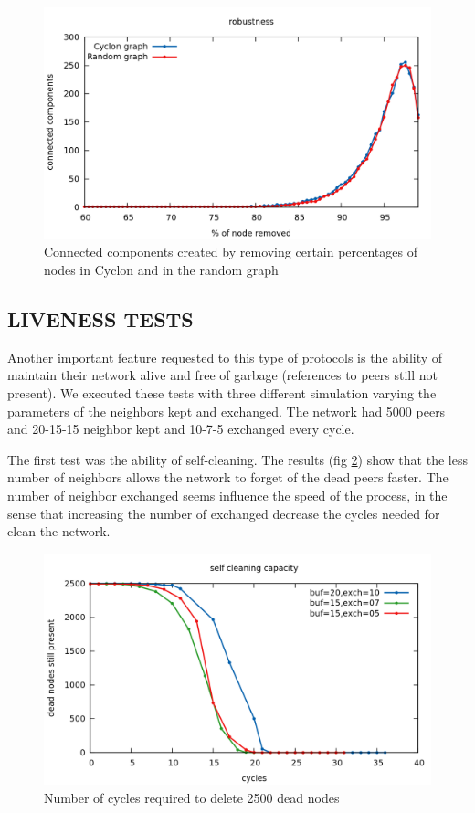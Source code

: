 \documentclass[a4paper,12pt,notitlepage]{article} %
\begin{document}
\begin{figure} [H]
	\centering
	\includegraphics[width=1\textwidth]{img/robustness}
	\caption{Connected components created by removing certain percentages of nodes in Cyclon and in the random graph}
	\label{robust}
\end{figure}

 \subsection{LIVENESS TESTS}

Another important feature requested to this type of protocols is the ability of maintain their network
 alive and free of garbage (references to peers still not present). We executed these tests with three different 
 simulation varying the parameters of the neighbors kept and exchanged. The network had 5000 peers and
 20-15-15 neighbor kept and 10-7-5 exchanged every cycle.

The first test was the ability of self-cleaning. The results (fig \ref{sc}) show that the less number of neighbors
 allows the network to forget of the dead peers faster. The number of neighbor exchanged seems influence
 the speed of the process, in the sense that increasing the number of exchanged decrease the cycles needed
 for clean the network.

\begin{figure} [H]
	\centering
	\includegraphics[width=1\textwidth]{img/self_cleaning}
	\caption{Number of cycles required to delete 2500 dead nodes}
	\label{sc}
\end{figure}
\end{document}
